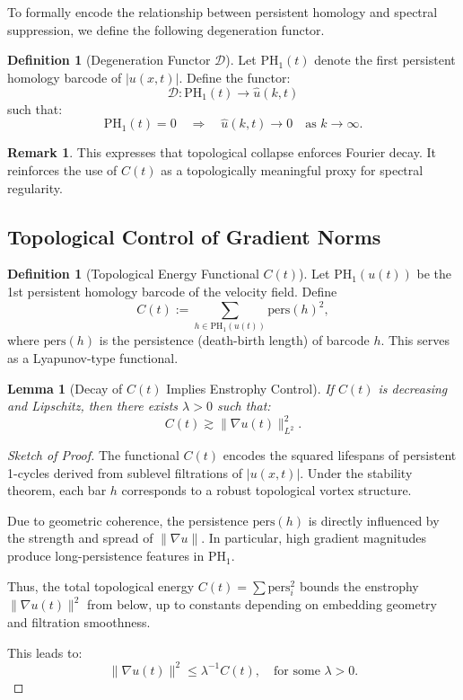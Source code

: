 \documentclass[11pt]{article}
\newtheorem{lemma}[theorem]{Lemma}
\theoremstyle{definition}
\newtheorem{definition}[theorem]{Definition}
\newtheorem{remark}[theorem]{Remark}
\begin{document}
To formally encode the relationship between persistent homology and spectral suppression,  
we define the following degeneration functor.

\begin{definition}[Degeneration Functor $\mathcal{D}$]
Let $\mathrm{PH}_1(t)$ denote the first persistent homology barcode of $|u(x,t)|$.  
Define the functor:
\[
\mathcal{D} : \mathrm{PH}_1(t) \longrightarrow \widehat{u}(k,t)
\]
such that:
\[
\mathrm{PH}_1(t) = 0 \quad \Rightarrow \quad \widehat{u}(k,t) \rightarrow 0 \quad \text{as } k \to \infty.
\]
\end{definition}

\begin{remark}
This expresses that topological collapse enforces Fourier decay.  
It reinforces the use of $C(t)$ as a topologically meaningful proxy for spectral regularity.
\end{remark}


\subsection{Topological Control of Gradient Norms}

\begin{definition}[Topological Energy Functional $C(t)$]
Let $\mathrm{PH}_1(u(t))$ be the 1st persistent homology barcode of the velocity field. Define
\[
C(t) := \sum_{h \in \mathrm{PH}_1(u(t))} \mathrm{pers}(h)^2,
\]
where $\mathrm{pers}(h)$ is the persistence (death-birth length) of barcode $h$. This serves as a Lyapunov-type functional.
\end{definition}

\begin{lemma}[Decay of $C(t)$ Implies Enstrophy Control]
If $C(t)$ is decreasing and Lipschitz, then there exists $\lambda > 0$ such that:
\[
C(t) \gtrsim \| \nabla u(t) \|_{L^2}^2.
\]
\end{lemma}

\begin{proof}[Sketch of Proof]
The functional $C(t)$ encodes the squared lifespans of persistent 1-cycles derived from sublevel filtrations of $|u(x,t)|$. Under the stability theorem, each bar $h$ corresponds to a robust topological vortex structure. 

Due to geometric coherence, the persistence $\mathrm{pers}(h)$ is directly influenced by the strength and spread of $\|\nabla u\|$. In particular, high gradient magnitudes produce long-persistence features in $\mathrm{PH}_1$.

Thus, the total topological energy $C(t) = \sum \mathrm{pers}_i^2$ bounds the enstrophy $\|\nabla u(t)\|^2$ from below, up to constants depending on embedding geometry and filtration smoothness.

This leads to:
\[
\|\nabla u(t)\|^2 \leq \lambda^{-1} C(t), \quad \text{for some } \lambda > 0.
\]
\end{proof}
        
\end{document}

